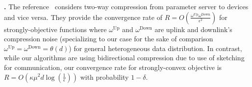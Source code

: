 \documentclass[sigconf, anonymous, review]{acmart}
\begin{document}
\textbf{\citep{philippenko2020artemis}.} 
The reference~\citep{philippenko2020artemis} considers two-way compression from parameter server to devices and vice versa. They provide the convergence rate of $R=O\left(\frac{\omega^{\text{Up}}\omega^{\text{Down}}}{\epsilon^2}\right)$ for strongly-objective functions where $\omega^{\text{Up}}$ and $\omega^{\text{Down}}$ are uplink and downlink's compression noise (specializing to our case for the sake of comparison $\omega^{\text{Up}}=\omega^{\text{Down}}=\theta\left(d\right)$) for general heterogeneous data distribution. In contrast, while our algorithms are using bidirectional compression due to use of sketching for communication, our convergence rate for strongly-convex objective is $R=O(\kappa\mu^2d\log\left(\frac{1}{\epsilon}\right))$ with probability $1-\delta$.  

\end{document}
